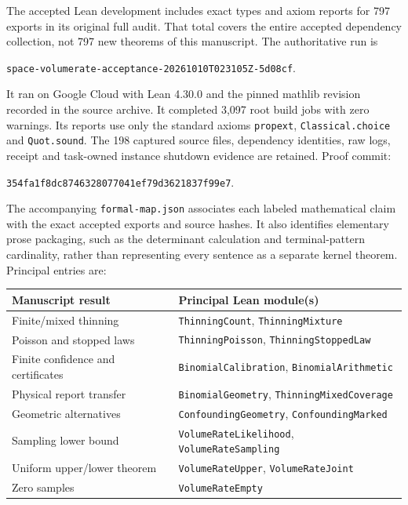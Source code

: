 \documentclass[11pt]{article}
\theoremstyle{remark}
\begin{document}
The accepted Lean development includes exact types and axiom reports for
797 exports in its original full audit. That total covers the entire
accepted dependency collection, not 797 new theorems of this manuscript.
The authoritative run is
\begin{center}\small
\texttt{space-volumerate-acceptance-20261010T023105Z-5d08cf}.
\end{center}
It ran on Google Cloud with Lean 4.30.0 and the pinned mathlib revision
recorded in the source archive. It completed 3,097 root build jobs with
zero warnings. Its reports use only the standard axioms
\texttt{propext}, \texttt{Classical.choice} and \texttt{Quot.sound}.
The 198 captured source files, dependency identities, raw logs, receipt
and task-owned instance shutdown evidence are retained. Proof commit:
\begin{center}\small
\texttt{354fa1f8dc8746328077041ef79d3621837f99e7}.
\end{center}

The accompanying \texttt{formal-map.json} associates each labeled
mathematical claim with the exact accepted exports and source hashes.
It also identifies elementary prose packaging, such as the determinant
calculation and terminal-pattern cardinality, rather than representing
every sentence as a separate kernel theorem. Principal entries are:
\begin{center}
\small
\begin{tabular}{ll}
\toprule
Manuscript result & Principal Lean module(s)\\
\midrule
Finite/mixed thinning & \texttt{ThinningCount}, \texttt{ThinningMixture}\\
Poisson and stopped laws & \texttt{ThinningPoisson}, \texttt{ThinningStoppedLaw}\\
Finite confidence and certificates & \texttt{BinomialCalibration}, \texttt{BinomialArithmetic}\\
Physical report transfer & \texttt{BinomialGeometry}, \texttt{ThinningMixedCoverage}\\
Geometric alternatives & \texttt{ConfoundingGeometry}, \texttt{ConfoundingMarked}\\
Sampling lower bound & \texttt{VolumeRateLikelihood}, \texttt{VolumeRateSampling}\\
Uniform upper/lower theorem & \texttt{VolumeRateUpper}, \texttt{VolumeRateJoint}\\
Zero samples & \texttt{VolumeRateEmpty}\\
\bottomrule
\end{tabular}
\end{center}
\end{document}
